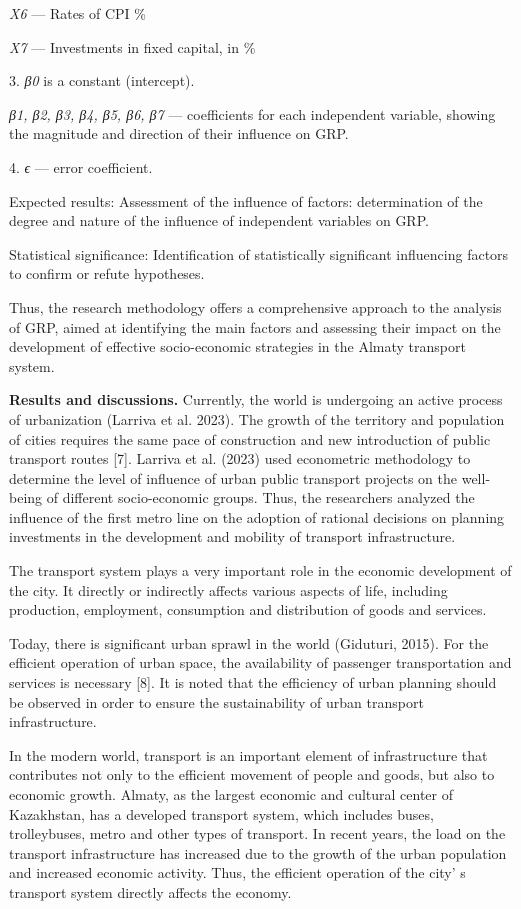 \begin{multicols}{2}
\emph{X6} --- Rates of CPI \%

\emph{X7} --- Investments in fixed capital, in \%

3. \emph{β0} is a constant (intercept).

\emph{β1, β2, β3, β4, β5, β6, β7} --- coefficients for each independent
variable, showing the magnitude and direction of their influence on GRP.

4. \emph{ϵ} --- error coefficient.

Expected results: Assessment of the influence of factors: determination
of the degree and nature of the influence of independent variables on
GRP.

Statistical significance: Identification of statistically significant
influencing factors to confirm or refute hypotheses.

Thus, the research methodology offers a comprehensive approach to the
analysis of GRP, aimed at identifying the main factors and assessing
their impact on the development of effective socio-economic strategies
in the Almaty transport system.

{\bfseries Results and discussions.} Currently, the world is undergoing an
active process of urbanization (Larriva et al. 2023). The growth of the
territory and population of cities requires the same pace of
construction and new introduction of public transport routes {[}7{]}.
Larriva et al. (2023) used econometric methodology to determine the
level of influence of urban public transport projects on the well-being
of different socio-economic groups. Thus, the researchers analyzed the
influence of the first metro line on the adoption of rational decisions
on planning investments in the development and mobility of transport
infrastructure.

The transport system plays a very important role in the economic
development of the city. It directly or indirectly affects various
aspects of life, including production, employment, consumption and
distribution of goods and services.

Today, there is significant urban sprawl in the world (Giduturi, 2015).
For the efficient operation of urban space, the availability of
passenger transportation and services is necessary {[}8{]}. It is noted
that the efficiency of urban planning should be observed in order to
ensure the sustainability of urban transport infrastructure.

In the modern world, transport is an important element of infrastructure
that contributes not only to the efficient movement of people and goods,
but also to economic growth. Almaty, as the largest economic and
cultural center of Kazakhstan, has a developed transport system, which
includes buses, trolleybuses, metro and other types of transport. In
recent years, the load on the transport infrastructure has increased due
to the growth of the urban population and increased economic activity.
Thus, the efficient operation of the city' s transport
system directly affects the economy.
\end{multicols}

